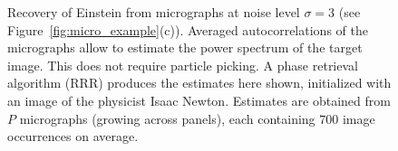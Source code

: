 \documentclass[english,11pt]{article}
\newcommand{\1}{\mathbf{1}}
\newcommand{\TODO}[1]{{\color{red}{[#1]}}}
\numberwithin{equation}{section}
\theoremstyle{plain}
\theoremstyle{definition}
\theoremstyle{remark}
\theoremstyle{plain}
\theoremstyle{remark}
\theoremstyle{plain}
\theoremstyle{plain}
\newcommand{\SNR}{\ensuremath{\textsf{SNR}}}
\begin{document}
\begin{figure}[h!]

	\caption{\label{fig:Einst_example} Recovery of Einstein from micrographs at noise level $\sigma = 3$ (see Figure~\ref{fig:micro_example}(c)). Averaged autocorrelations of the micrographs allow to estimate the power spectrum of the target image. This does not require particle picking. A phase retrieval algorithm (RRR) produces the estimates here shown, initialized with an image of the physicist Isaac Newton. Estimates are obtained from $P$ micrographs (growing across panels), each containing $700$ image occurrences on average.
		\TODO{To add: redo the figures according to Amit's comments}
	}
\end{figure}
\end{document}
